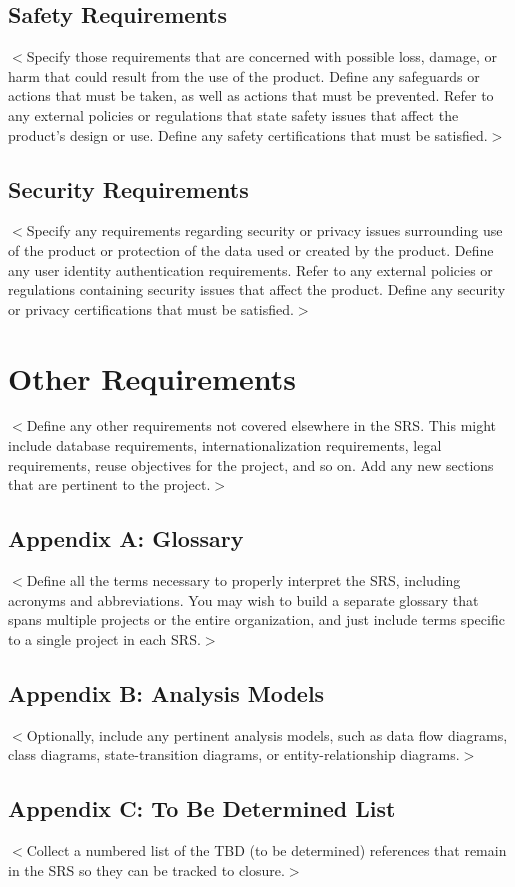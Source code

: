 \documentclass{scrreprt}
\begin{document}
\begin{CJK*}{UTF8}{bsmi}
\section{Safety Requirements}
$<$Specify those requirements that are concerned with possible loss, damage, or 
harm that could result from the use of the product. Define any safeguards or 
actions that must be taken, as well as actions that must be prevented. Refer to 
any external policies or regulations that state safety issues that affect the 
product’s design or use. Define any safety certifications that must be 
satisfied.$>$

\section{Security Requirements}
$<$Specify any requirements regarding security or privacy issues surrounding use 
of the product or protection of the data used or created by the product. Define 
any user identity authentication requirements. Refer to any external policies or 
regulations containing security issues that affect the product. Define any 
security or privacy certifications that must be satisfied.$>$


\chapter{Other Requirements}
$<$Define any other requirements not covered elsewhere in the SRS. This might 
include database requirements, internationalization requirements, legal 
requirements, reuse objectives for the project, and so on. Add any new sections 
that are pertinent to the project.$>$

\section{Appendix A: Glossary}
$<$Define all the terms necessary to properly interpret the SRS, including 
acronyms and abbreviations. You may wish to build a separate glossary that spans 
multiple projects or the entire organization, and just include terms specific to 
a single project in each SRS.$>$

\section{Appendix B: Analysis Models}
$<$Optionally, include any pertinent analysis models, such as data flow 
diagrams, class diagrams, state-transition diagrams, or entity-relationship 
diagrams.$>$

\section{Appendix C: To Be Determined List}
$<$Collect a numbered list of the TBD (to be determined) references that remain 
in the SRS so they can be tracked to closure.$>$
\end{CJK*}
\end{document}
